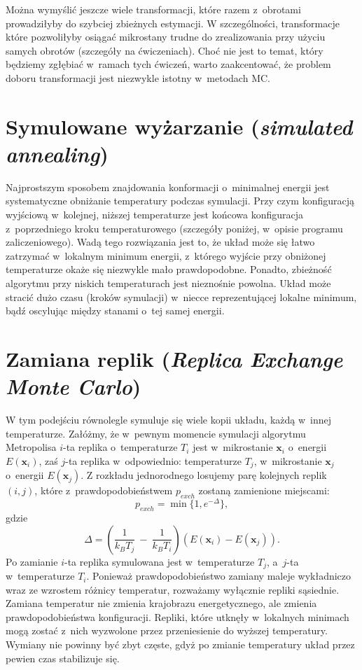 \documentclass[a4paper,11pt,twoside]{book}
\begin{document}
Można wymyślić jeszcze wiele transformacji, które razem z~obrotami prowadziłyby do szybciej zbieżnych estymacji. W szczególności, transformacje które pozwoliłyby osiągać mikrostany trudne do zrealizowania przy użyciu samych obrotów (szczegóły na ćwiczeniach). Choć nie jest to temat, który będziemy zgłębiać w~ramach tych ćwiczeń, warto zaakcentować, że problem doboru transformacji jest niezwykle istotny w~metodach MC.
\section{Symulowane wyżarzanie (\emph{simulated annealing})}
Najprostszym sposobem znajdowania konformacji o~minimalnej energii jest systematyczne obniżanie temperatury podczas symulacji. Przy czym konfiguracją wyjściową w~kolejnej, niższej temperaturze jest końcowa konfiguracja z~poprzedniego kroku temperaturowego (szczegóły poniżej, w~opisie programu zaliczeniowego). Wadą tego rozwiązania jest to, że układ może się łatwo zatrzymać w~lokalnym minimum energii, z~którego wyjście przy obniżonej temperaturze okaże się niezwykle mało prawdopodobne. Ponadto, zbieżność algorytmu przy niskich temperaturach jest nieznośnie powolna. Układ może stracić dużo czasu (kroków symulacji) w~niecce reprezentującej lokalne minimum, bądź oscylując między stanami o~tej samej energii.
\section{Zamiana replik (\emph{Replica Exchange Monte Carlo})}
W tym podejściu równolegle symuluje się wiele kopii układu, każdą w~innej
temperaturze. Załóżmy, że w~pewnym momencie symulacji algorytmu Metropolisa $i$-ta replika o~temperaturze $T_i$ jest w~mikrostanie $\mathbf{x}_i$ o~energii $E(\mathbf{x}_i )$, zaś
$j$-ta replika w~odpowiednio: temperaturze $T_j$, w~mikrostanie $\mathbf{x}_j$ o~energii $E(\mathbf{x}_j )$. Z rozkładu jednorodnego losujemy parę kolejnych replik $(i, j)$, które z~prawdopodobieństwem $p_{exch}$ zostaną zamienione miejscami:
\begin{displaymath}
p_{exch}=\min \{ 1, e^{-\Delta} \} ,
\end{displaymath}
gdzie 
\begin{displaymath}
\Delta = \left ( \frac{1}{k_B T_j}~-~\frac{1}{k_B T_i}  \right ) ( E(\mathbf{x}_i) -E(\mathbf{x}_j)  ).
\end{displaymath}
Po zamianie $i$-ta replika symulowana jest w~temperaturze $T_j$, a~$j$-ta w~temperaturze $T_i$. Ponieważ prawdopodobieństwo zamiany maleje wykładniczo wraz ze wzrostem różnicy temperatur, rozważamy wyłącznie repliki sąsiednie. Zamiana temperatur nie zmienia krajobrazu energetycznego, ale zmienia prawdopodobieństwa konfiguracji. Repliki, które utknęły w~lokalnych minimach mogą zostać z~nich wyzwolone przez przeniesienie do wyższej temperatury. Wymiany nie powinny być zbyt częste, gdyż po zmianie temperatury układ przez pewien czas stabilizuje się.\\
\end{document}
